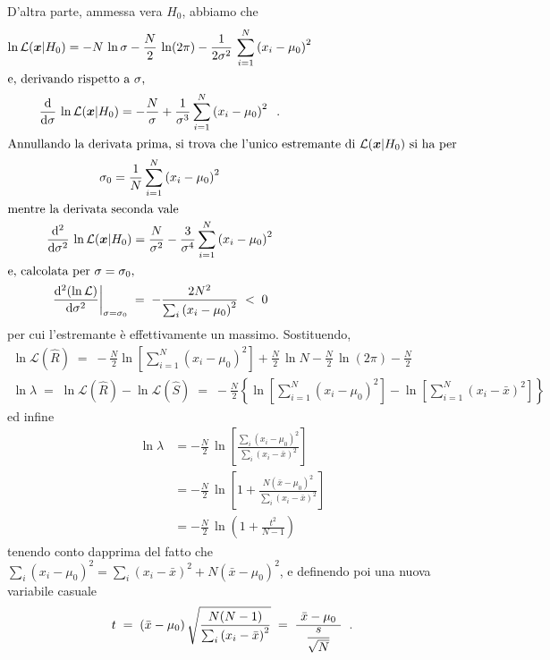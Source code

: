 D'altra parte, ammessa vera $H_0$, abbiamo che
\begin{gather*}
  \ln \mathcal{L} ( \boldsymbol{x} | H_0 ) = - N \, \ln
    \sigma - \frac{N}{2} \, \ln ( 2 \pi ) - \frac{1}{2
    \sigma^2} \, \sum_{i=1}^N \left( x_i - \mu_0 \right)^2
    \\
  \intertext{e, derivando rispetto a $\sigma$,}
  \frac{\mathrm{d}}{\mathrm{d} \sigma} \, \ln \mathcal{L} ( \boldsymbol{x}
    | H_0 ) =  - \frac{N}{\sigma} + \frac{1}{\sigma^3}
    \sum_{i=1}^N \left( x_i - \mu_0 \right)^2 \;\; . \\
  \intertext{Annullando la derivata prima, si trova che
    l'unico estremante di $\mathcal{L} ( \boldsymbol{x} |
    H_0 )$ si ha per}
  \sigma_0 = \frac{1}{N} \sum_{i=1}^N \left( x_i - \mu_0
    \right)^2 \\
  \intertext{mentre la derivata seconda vale}
  \frac{\mathrm{d}^2}{\mathrm{d} \sigma^2} \, \ln \mathcal{L} (
    \boldsymbol{x} | H_0 ) = \frac{N}{\sigma^2} -
    \frac{3}{\sigma^4} \sum_{i=1}^N \left( x_i - \mu_0
    \right)^2 \\
  \intertext{e, calcolata per $\sigma = \sigma_0$,}
  \left. \frac{\mathrm{d}^2 (\ln \mathcal{L}) }{\mathrm{d} \sigma^2}
    \right|_{\sigma = \sigma_0} \; = \; - \frac{2 N^2}{
    \sum_i \left( x_i - \mu_0 \right)^2 } \; < \; 0 \\
\end{gather*}
per cui l'estremante \`e effettivamente un massimo.
Sostituendo,
\begin{gather*}
  \ln \mathcal{L} (\widehat R) \; = \; - \frac{N}{2} \ln \left[
    \sum_{i=1}^N \left( x_i - \mu_0 \right)^2 \right] +
    \frac{N}{2} \, \ln N - \frac{N}{2} \, \ln ( 2 \pi ) -
    \frac{N}{2} \\[1ex]
  \ln \lambda \; = \; \ln \mathcal{L} (\widehat R) - \ln
    \mathcal{L} (\widehat S) \; = \; - \frac{N}{2} \left\{ \ln
    \left[ \sum_{i=1}^N \left( x_i - \mu_0 \right)^2 \right]
    - \ln \left[ \sum_{i=1}^N \left( x_i - \bar x \right)^2
    \right] \right\}
\end{gather*}
ed infine
\begin{align*}
  \ln \lambda &= - \frac{N}{2} \, \ln \left[ \frac{ \sum_i
    \left( x_i - \mu_0 \right)^2 }{ \sum_i \left( x_i - \bar
    x \right)^2 } \right] \\[1.5ex]
  &= - \frac{N}{2} \, \ln \left[ 1 + \frac{N \left( \bar x -
    \mu_0 \right)^2 }{ \sum_i \left( x_i - \bar x \right)^2
    } \right] \\[1.5ex]
  &= - \frac{N}{2} \, \ln \left( 1 + \frac{t^2}{N - 1}
    \right)
\end{align*}
tenendo conto dapprima del fatto che $\sum_i ( x_i - \mu_0
)^2 = \sum_i ( x_i - \bar x )^2 + N (\bar x - \mu_0 )^2$, e
definendo poi una nuova variabile casuale
\begin{equation*}
  t \; = \; \left( \bar x - \mu_0 \right) \sqrt{ \frac{N (N
    - 1)}{\sum_i \left( x_i - \bar x \right)^2} } \; = \;
    \frac{\phantom{t} \bar x - \mu_0 \phantom{t}}{
    \dfrac{s}{\sqrt{N}} } \;\; .
\end{equation*}

